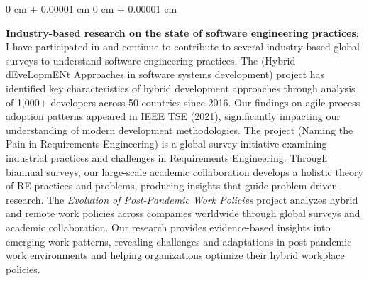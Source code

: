 \documentclass[10pt, a4paper]{article}
\newenvironment{onecolentry}{
    \begin{adjustwidth}{
        0 cm + 0.00001 cm
    }{
        0 cm + 0.00001 cm
    }
}{
    \end{adjustwidth}
} %
\let\hrefWithoutArrow\href
\renewcommand{\href}[2]{\hrefWithoutArrow{#1}{\ifthenelse{\equal{#2}{}}{ }{#2 }\raisebox{.15ex}{\footnotesize \faExternalLink*}}}
\begin{document}
        \begin{onecolentry}
            \textbf{Industry-based research on the state of software engineering practices}: I have participated in and continue to contribute to several industry-based global surveys to understand software engineering practices. The \href{https://helenastudy.wordpress.com/helena-team}{\textit{HELENA}} (Hybrid dEveLopmENt Approaches in software systems development) project has identified key characteristics of hybrid development approaches through analysis of 1,000+ developers across 50 countries since 2016. Our findings on agile process adoption patterns appeared in IEEE TSE (2021), significantly impacting our understanding of modern development methodologies. The \href{http://www.napire.org}{\textit{NaPiRE}} project (Naming the Pain in Requirements Engineering) is a global survey initiative examining industrial practices and challenges in Requirements Engineering. Through biannual surveys, our large-scale academic collaboration develops a holistic theory of RE practices and problems, producing insights that guide problem-driven research. The \textit{Evolution of Post-Pandemic Work Policies} project analyzes hybrid and remote work policies across companies worldwide through global surveys and academic collaboration. Our research provides evidence-based insights into emerging work patterns, revealing challenges and adaptations in post-pandemic work environments and helping organizations optimize their hybrid workplace policies.
        \end{onecolentry}

        \vspace{0.2 cm}
\end{document}
